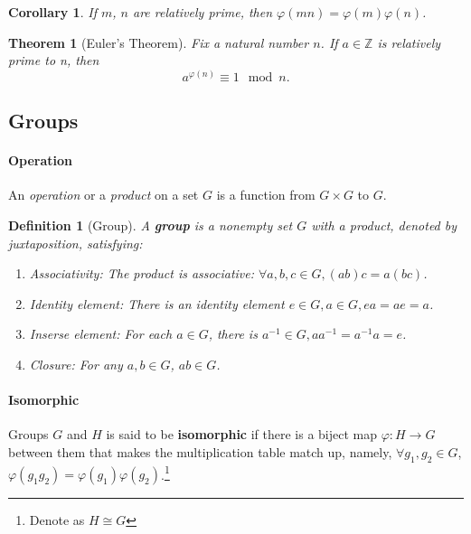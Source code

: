 \documentclass[12pt]{article}
\newtheorem{definition}{Definition}[subsection]
\newtheorem{theorem}{Theorem}[subsection]
\newtheorem{corollary}{Corollary}[subsection]
\begin{document}
    \begin{corollary}
        If $m$, $n$ are relatively prime, then $\varphi(mn) = \varphi(m)\varphi(n)$.
    \end{corollary}
    
    \begin{theorem}[Euler's Theorem]
        Fix a natural number $n$. If $a \in \mathbb{Z}$ is relatively prime to n, then
        \begin{equation}
            a^{\varphi(n)} \equiv 1 \mod n.
        \end{equation}

    \end{theorem}

\subsection{Groups}

\paragraph{Operation} An \textit{operation} or a \textit{product} on a set $G$ is a function from $G \times G$ to $G$.
\begin{definition}[Group]
    A \textbf{group} is a nonempty set $G$ with a product, denoted by juxtaposition, satisfying:
    \begin{enumerate}
        \item Associativity: The product is associative: $\forall a,b,c \in G, (ab)c = a(bc)$.
        \item Identity element: There is an identity element $e \in G, a \in G, ea = ae = a$.
        \item Inserse element: For each $a \in G$, there is $a^{-1} \in G, aa^{-1} = a^{-1}a = e$.
        \item Closure: For any $a, b \in G$, $ab \in G$.
    \end{enumerate}

\end{definition}
\paragraph{Isomorphic} Groups $G$ and $H$ is said to be \textbf{isomorphic} if there is a biject map $\varphi: H \rightarrow G$ between them that makes the multiplication table match up, namely, $\forall g_1,g_2 \in G$, $\varphi(g_1g_2) = \varphi(g_1)\varphi(g_2)$.\footnote{Denote as $H \cong G$}
\end{document}
